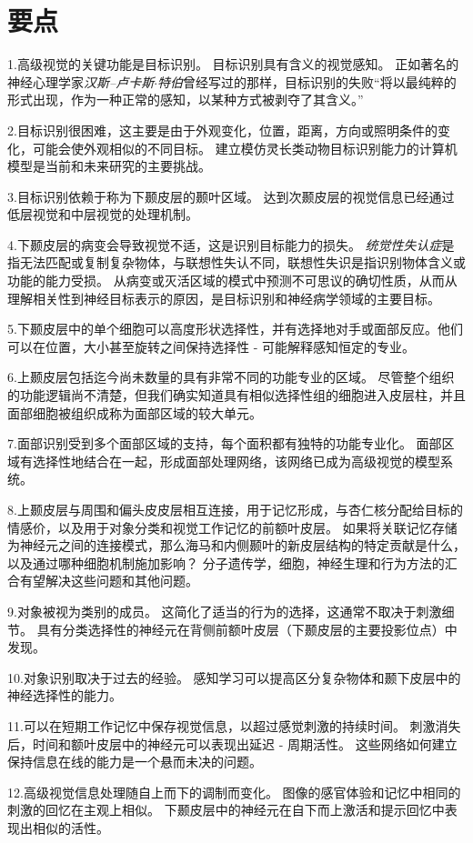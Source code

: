 \section{要点}

1.高级视觉的关键功能是目标识别。
目标识别具有含义的视觉感知。
正如著名的神经心理学家\textit{汉斯–卢卡斯$\cdot$特伯}曾经写过的那样，目标识别的失败“将以最纯粹的形式出现，作为一种正常的感知，以某种方式被剥夺了其含义。” 


2.目标识别很困难，这主要是由于外观变化，位置，距离，方向或照明条件的变化，可能会使外观相似的不同目标。
建立模仿灵长类动物目标识别能力的计算机模型是当前和未来研究的主要挑战。


3.目标识别依赖于称为下颞皮层的颞叶区域。
达到次颞皮层的视觉信息已经通过低层视觉和中层视觉的处理机制。


4.下颞皮层的病变会导致视觉不适，这是识别目标能力的损失。
\textit{统觉性失认症}是指无法匹配或复制复杂物体，与联想性失认不同，联想性失识是指识别物体含义或功能的能力受损。
从病变或灭活区域的模式中预测不可思议的确切性质，从而从理解相关性到神经目标表示的原因，是目标识别和神经病学领域的主要目标。 


5.下颞皮层中的单个细胞可以高度形状选择性，并有选择地对手或面部反应。他们可以在位置，大小甚至旋转之间保持选择性 - 可能解释感知恒定的专业。


6.上颞皮层包括迄今尚未数量的具有非常不同的功能专业的区域。
尽管整个组织的功能逻辑尚不清楚，但我们确实知道具有相似选择性组的细胞进入皮层柱，并且面部细胞被组织成称为面部区域的较大单元。 


7.面部识别受到多个面部区域的支持，每个面积都有独特的功能专业化。
面部区域有选择性地结合在一起，形成面部处理网络，该网络已成为高级视觉的模型系统。


8.上颞皮层与周围和偏头皮皮层相互连接，用于记忆形成，与杏仁核分配给目标的情感价，以及用于对象分类和视觉工作记忆的前额叶皮层。
如果将关联记忆存储为神经元之间的连接模式，那么海马和内侧颞叶的新皮层结构的特定贡献是什么，以及通过哪种细胞机制施加影响？
分子遗传学，细胞，神经生理和行为方法的汇合有望解决这些问题和其他问题。


9.对象被视为类别的成员。
这简化了适当的行为的选择，这通常不取决于刺激细节。 具有分类选择性的神经元在背侧前额叶皮层（下颞皮层的主要投影位点）中发现。


10.对象识别取决于过去的经验。
感知学习可以提高区分复杂物体和颞下皮层中的神经选择性的能力。


11.可以在短期工作记忆中保存视觉信息，以超过感觉刺激的持续时间。
刺激消失后，时间和额叶皮层中的神经元可以表现出延迟 - 周期活性。
这些网络如何建立保持信息在线的能力是一个悬而未决的问题。


12.高级视觉信息处理随自上而下的调制而变化。
图像的感官体验和记忆中相同的刺激的回忆在主观上相似。
下颞皮层中的神经元在自下而上激活和提示回忆中表现出相似的活性。


